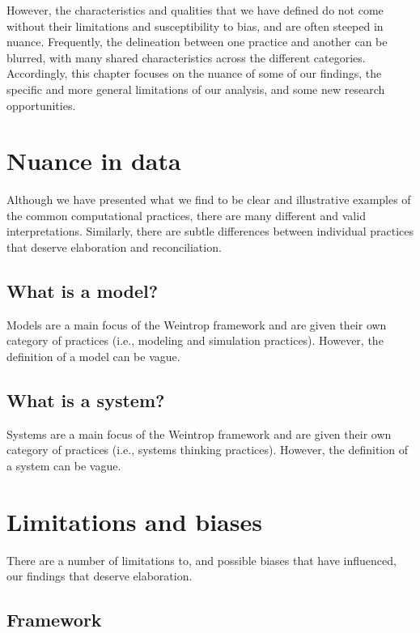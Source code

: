\documentclass{msuphddissertation}
\begin{document}
\begin{doublespace}
However, the characteristics and qualities that we have defined do not come without their limitations and susceptibility to bias, and are often steeped in nuance.  Frequently, the delineation between one practice and another can be blurred, with many shared characteristics across the different categories.  Accordingly, this chapter focuses on the nuance of some of our findings, the specific and more general limitations of our analysis, and some new research opportunities.  

\section{Nuance in data}

Although we have presented what we find to be clear and illustrative examples of the common computational practices, there are many different and valid interpretations.  Similarly, there are subtle differences between individual practices that deserve elaboration and reconciliation.

\subsection{What is a model?}

Models are a main focus of the Weintrop framework and are given their own category of practices (i.e., modeling and simulation practices).  However, the definition of a model can be vague.

\subsection{What is a system?}

Systems are a main focus of the Weintrop framework and are given their own category of practices (i.e., systems thinking practices).  However, the definition of a system can be vague. 

\section{Limitations and biases}

There are a number of limitations to, and possible biases that have influenced, our findings that deserve elaboration.

\subsection{Framework}


\end{doublespace}
\end{document}
